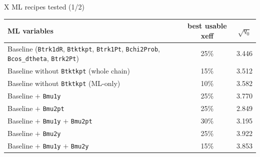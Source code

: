 \begin{frame}[label=p10]{X ML recipes tested (1/2)}
  \small
  \begin{center}
    \renewcommand{\arraystretch}{1.14}
    \setlength{\tabcolsep}{3pt}
    \begin{tabular}{p{}cc}
      \toprule
      ML variables & best usable xeff & $\sqrt{q_0}$ \\
      \midrule
      Baseline (\texttt{Btrk1dR}, \texttt{Btktkpt}, \texttt{Btrk1Pt},
      \texttt{Bchi2Prob}, \texttt{Bcos\_dtheta}, \texttt{Btrk2Pt})
      & 25\% & 3.446 \\
      Baseline without \texttt{Btktkpt} (whole chain) & 15\% & 3.512 \\
      Baseline without \texttt{Btktkpt} (ML-only) & 10\% & 3.582 \\
      Baseline $+$ \texttt{Bmu1y} & 25\% & 3.770 \\
      Baseline $+$ \texttt{Bmu2pt} & 25\% & 2.849 \\
      Baseline $+$ \texttt{Bmu1y} $+$ \texttt{Bmu2pt} & 30\% & 3.195 \\
      Baseline $+$ \texttt{Bmu2y} & 25\% & 3.922 \\
      Baseline $+$ \texttt{Bmu1y} $+$ \texttt{Bmu2y} & 15\% & 3.853 \\
      \bottomrule
    \end{tabular}
  \end{center}
\end{frame}

